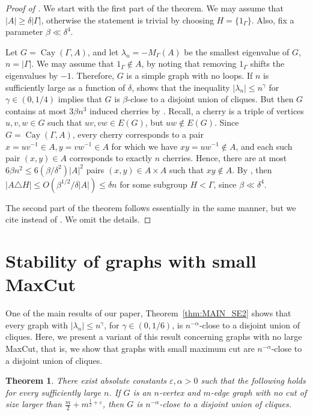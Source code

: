 \documentclass[11pt]{article}
\theoremstyle{plain}
\newtheorem{theorem}{Theorem}[section]
\theoremstyle{definition}
\newcommand{\eps}{\varepsilon}
\DeclareMathOperator{\Cay}{Cay}
\begin{document}
\begin{proof}[Proof of ]
    We start with the first part of the theorem. 
    We may assume that $|A|\geq \delta |\Gamma|$, otherwise the statement is trivial by choosing $H=\{1_\Gamma\}$. Also, fix a parameter $\beta\ll \delta^4$.
    
    Let $G=\Cay(\Gamma,A)$, and let $\lambda_n=-M_\Gamma(A)$ be the smallest eigenvalue of $G$, $n=|\Gamma|$. 
    We may assume that $1_\Gamma\not\in A$, by noting that removing $1_\Gamma$ shifts the eigenvalues by $-1$. Therefore, $G$ is a simple graph with no loops. 
    If $n$ is sufficiently large as a function of $\delta$,  shows that the inequality $|\lambda_n|\leq n^{\gamma}$ for $\gamma\in (0, 1/4)$ implies that $G$ is $\beta$-close to a disjoint union of cliques. 
    But then $G$ contains at most $3\beta n^3$ induced cherries by . Recall, a cherry is a triple of vertices $u, v, w\in G$ such that $uv, vw\in E(G)$, but $uw\notin E(G)$.
    Since $G=\Cay(\Gamma, A)$, every cherry corresponds to a pair $x=uv^{-1}\in A, y=vw^{-1}\in A$ for which we have $xy=uw^{-1}\notin A$, and each such pair $(x, y)\in A$ corresponds to exactly $n$ cherries. Hence, there are at most $6\beta n^2\leq 6(\beta/\delta^2)|A|^2$ pairs $(x,y)\in A\times A$ such that $xy\not\in A$. 
    By , then $|A\triangle H|\leq O(\beta^{1/2}/\delta |A|)\leq \delta n$ for some subgroup $H<\Gamma$, since $\beta\ll\delta^4$.
    
    The second part of the theorem follows essentially in the same manner, but we cite  instead of . We omit the details.
\end{proof}


\section{Stability of graphs with small MaxCut}\label{sect:MaxCut_stability}

One of the main results of our paper, Theorem~\ref{thm:MAIN_SE2} shows that every graph with $|\lambda_n|\leq n^\gamma$, for $\gamma\in (0, 1/6)$, is $n^{-\alpha}$-close to a disjoint union of cliques. Here, we present a variant of this result concerning graphs with no large MaxCut, that is, we show that graphs with small maximum cut are $n^{-\alpha}$-close to a disjoint union of cliques.

\begin{theorem}\label{thm:MAIN_MC2}
    There exist absolute constants $\eps, \alpha>0$ such that the following holds for every sufficiently large $n$. 
    If $G$ is an $n$-vertex and $m$-edge graph with no cut of size larger than $\frac{m}{2}+m^{\frac{1}{2}+\eps}$, then $G$ is $n^{-\alpha}$-close to a disjoint union of cliques.
\end{theorem}
\end{document}
